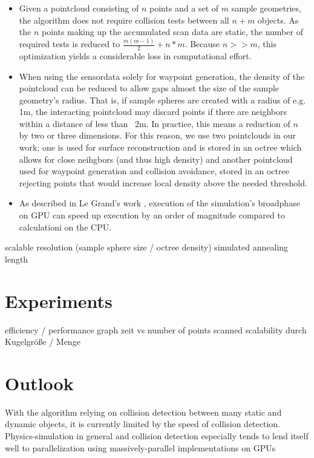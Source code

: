 \documentclass[a4paper, 10pt, conference]{ieeeconf}        %
\begin{document}
\begin{itemize}
  \item Given a pointcloud consisting of $n$ points and a set of $m$ sample geometries, the algorithm does not require collision tests between all $n+m$ objects. As the $n$ points making up the accumulated scan data are static, the number of required tests is reduced to $\frac{m(m-1)}{2} + n*m$. Because $n >> m$, this optimization yields a considerable loss in computational effort.
  \item When using the sensordata solely for waypoint generation, the density of the pointcloud can be reduced to allow gaps almost the size of the sample geometry's radius. That is, if sample spheres are created with a radius of e.g. 1m, the interacting pointcloud may discard points if there are neighbors within a distance of less than ~2m. In practice, this means a reduction of $n$ by two or three dimensions. For this reason, we use two pointclouds in our work; one is used for surface reconstruction and is stored in an octree which allows for close neihgbors (and thus high density) and another pointcloud used for waypoint generation and collision avoidance, stored in an octree rejecting points that would increase local density above the needed threshold.
  \item As described in Le Grand's work \cite{legrand2007}, execution of the simulation's broadphase on GPU can speed up execution by an order of magnitude compared to calculationi on the CPU.
\end{itemize}

scalable resolution (sample sphere size / octree density)
simulated annealing length

\section{Experiments}
efficiency / performance
graph zeit vs number of points scanned
scalability durch Kugelgröße / Menge

\section{Outlook}

With the algorithm relying on collision detection between many static and dynamic objects, it is currently limited by the speed of collision detection. Physics-simulation in general and collision detection especially tends to lend itself well to parallelization using massively-parallel implementations on GPUs
\end{document}
